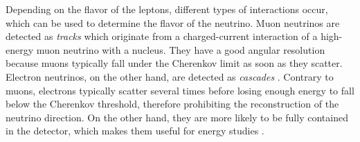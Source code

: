 Depending on the flavor of the leptons,
different types of interactions occur,
which can be used to determine the flavor of the neutrino.
%
%
%
Muon neutrinos are detected as \emph{tracks} \cite{icecube_aartsen}
  which originate from a charged-current interaction of a high-energy muon neutrino with a nucleus.
They have a good angular resolution
  because muons typically fall under the Cherenkov limit as soon as they scatter.
%
%
Electron neutrinos,
  on the other hand,
are detected as \emph{cascades} \cite{icecube_aartsen}.
Contrary to muons,
  electrons typically scatter several times before losing enough energy to fall below the Cherenkov threshold,
    therefore prohibiting the reconstruction of the neutrino direction.
On the other hand,
  they are more likely to be fully contained in the detector,
    which makes them useful for energy studies \cite{icecube_aartsen}.
%
